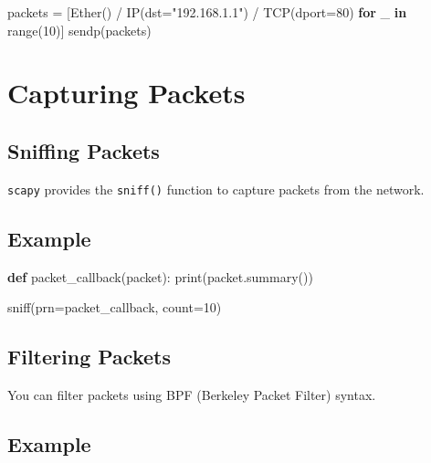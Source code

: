 \documentclass[
  letterpaper,
  DIV=11,
  numbers=noendperiod]{scrreprt}
\newenvironment{Shaded}{\begin{snugshade}}{\end{snugshade}}
\newcommand{\BuiltInTok}[1]{\textcolor[rgb]{0.00,0.23,0.31}{#1}}
\newcommand{\ControlFlowTok}[1]{\textcolor[rgb]{0.00,0.23,0.31}{\textbf{#1}}}
\newcommand{\DecValTok}[1]{\textcolor[rgb]{0.68,0.00,0.00}{#1}}
\newcommand{\KeywordTok}[1]{\textcolor[rgb]{0.00,0.23,0.31}{\textbf{#1}}}
\newcommand{\NormalTok}[1]{\textcolor[rgb]{0.00,0.23,0.31}{#1}}
\newcommand{\OperatorTok}[1]{\textcolor[rgb]{0.37,0.37,0.37}{#1}}
\newcommand{\StringTok}[1]{\textcolor[rgb]{0.13,0.47,0.30}{#1}}
\begin{document}
\begin{Shaded}
\begin{Highlighting}[]
\NormalTok{packets }\OperatorTok{=}\NormalTok{ [Ether() }\OperatorTok{/}\NormalTok{ IP(dst}\OperatorTok{=}\StringTok{"192.168.1.1"}\NormalTok{) }\OperatorTok{/}\NormalTok{ TCP(dport}\OperatorTok{=}\DecValTok{80}\NormalTok{) }\ControlFlowTok{for}\NormalTok{ \_ }\KeywordTok{in} \BuiltInTok{range}\NormalTok{(}\DecValTok{10}\NormalTok{)]}
\NormalTok{sendp(packets)}
\end{Highlighting}
\end{Shaded}

\section{Capturing Packets}\label{capturing-packets}

\subsection{Sniffing Packets}\label{sniffing-packets}

\texttt{scapy} provides the \texttt{sniff()} function to capture packets
from the network.

\subsection{Example}\label{example-21}

\begin{Shaded}
\begin{Highlighting}[]
\KeywordTok{def}\NormalTok{ packet\_callback(packet):}
    \BuiltInTok{print}\NormalTok{(packet.summary())}

\NormalTok{sniff(prn}\OperatorTok{=}\NormalTok{packet\_callback, count}\OperatorTok{=}\DecValTok{10}\NormalTok{)}
\end{Highlighting}
\end{Shaded}

\subsection{Filtering Packets}\label{filtering-packets}

You can filter packets using BPF (Berkeley Packet Filter) syntax.

\subsection{Example}\label{example-22}
\end{document}
